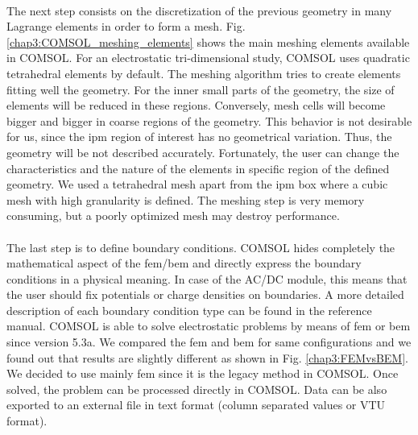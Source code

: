 \begin{refsection}
	\paragraph{}
	The next step consists on the discretization of the previous geometry in many Lagrange elements in order to form a mesh. Fig. \ref{chap3:COMSOL_meshing_elements} shows the main meshing elements available in COMSOL. For an electrostatic tri-dimensional study, COMSOL uses quadratic tetrahedral elements by default. The meshing algorithm tries to create elements fitting well the geometry. For the inner small parts of the geometry, the size of elements will be reduced in these regions. Conversely, mesh cells will become bigger and bigger in coarse regions of the geometry. This behavior is not desirable for us, since the \acrshort{ipm} region of interest has no geometrical variation. Thus, the geometry will be not described accurately. Fortunately, the user can change the characteristics and the nature of the elements in specific region of the defined geometry. We used a tetrahedral mesh apart from the \acrshort{ipm} box where a cubic mesh with high granularity is defined. The meshing step is very memory consuming, but a poorly optimized mesh may destroy performance.

	

	\paragraph{}
	The last step is to define boundary conditions. COMSOL hides completely the mathematical aspect of the \acrshort{fem}/\acrshort{bem} and directly express the boundary conditions in a physical meaning. In case of the AC/DC module, this means that the user should fix potentials or charge densities on boundaries. A more detailed description of each boundary condition type can be found in the reference manual. COMSOL is able to solve electrostatic problems by means of \acrshort{fem} or \acrshort{bem} since version 5.3a. We compared the \acrshort{fem} and \acrshort{bem} for same configurations and we found out that results are slightly different as shown in Fig. \ref{chap3:FEMvsBEM}. We decided to use mainly \acrshort{fem} since it is the legacy method in COMSOL.
	Once solved, the problem can be processed directly in COMSOL. Data can be also exported to an external file in text format (column separated values or VTU format).

	


\end{refsection}
